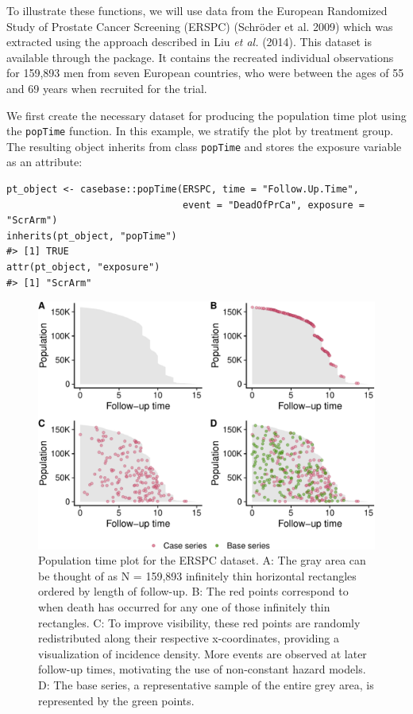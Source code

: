 To illustrate these functions, we will use data from the European Randomized Study of Prostate Cancer Screening (ERSPC) (Schröder et al. 2009) which was extracted using the approach described in Liu \emph{et al.} (2014). This dataset is available through the  package. It contains the recreated individual observations for 159,893 men from seven European countries, who were between the ages of 55 and 69 years when recruited for the trial.

We first create the necessary dataset for producing the population time plot using the \texttt{popTime} function. In this example, we stratify the plot by treatment group. The resulting object inherits from class \texttt{popTime} and stores the exposure variable as an attribute:

\begin{verbatim}
pt_object <- casebase::popTime(ERSPC, time = "Follow.Up.Time",
                               event = "DeadOfPrCa", exposure = "ScrArm")
inherits(pt_object, "popTime")
#> [1] TRUE
attr(pt_object, "exposure")
#> [1] "ScrArm"
\end{verbatim}

\begin{figure}[ht]
\includegraphics[width=\textwidth,keepaspectratio=true]{./plot-erspc-data-1} \caption{Population time plot for the ERSPC dataset. A: The gray area can be thought of as N = 159,893 infinitely thin horizontal rectangles ordered by length of follow-up. B: The red points correspond to when death has occurred for any one of those infinitely thin rectangles. C: To improve visibility, these red points are randomly redistributed along their respective x-coordinates, providing a visualization of incidence density. More events are observed at later follow-up times, motivating the use of non-constant hazard models. D: The base series, a representative sample of the entire grey area, is represented by the green points.}\label{fig:plot-erspc-data}
\end{figure}


